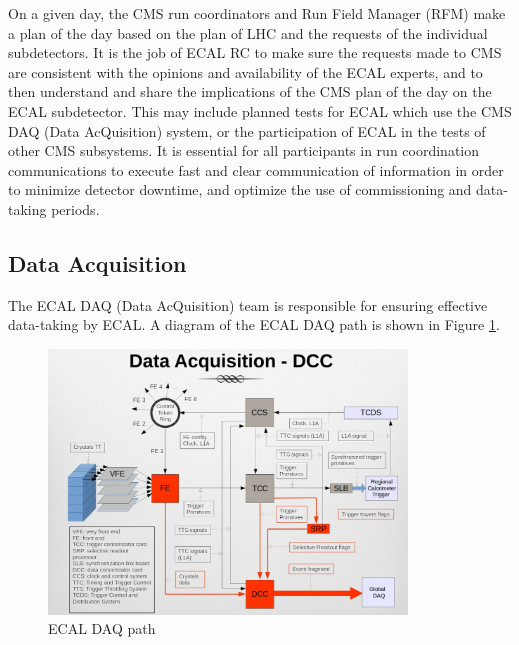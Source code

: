 On a given day, the CMS run coordinators and Run Field Manager (RFM) make a plan of the day based on the plan of LHC and the requests of the individual subdetectors. It is the job of ECAL RC to make sure the requests made to CMS are consistent with the opinions and availability of the ECAL experts, and to then understand and share the implications of the CMS plan of the day on the ECAL subdetector. This may include planned tests for ECAL which use the CMS DAQ (Data AcQuisition) system, or the participation of ECAL in the tests of other CMS subsystems. It is essential for all participants in run coordination communications to execute fast and clear communication of information in order to minimize detector downtime, and optimize the use of commissioning and data-taking periods. 

\subsection{Data Acquisition} \label{sec:ECAL_DAQ}


The ECAL DAQ (Data AcQuisition) team is responsible for ensuring effective data-taking by ECAL. A diagram of the ECAL DAQ path is shown in Figure \ref{fig:ECAL_DCC_Diagram}. 

\begin{figure}[H]
    \centering
    \includegraphics[width=0.85\textwidth]{Images/ECAL_Operations/ECAL_DCC_Diagram.png}
    \caption{ECAL DAQ path}
    \label{fig:ECAL_DCC_Diagram}
\end{figure}

